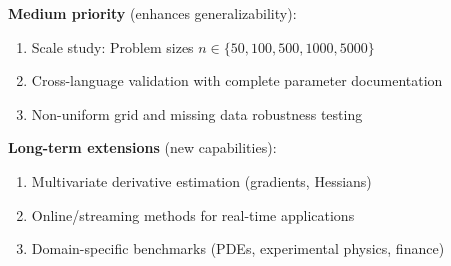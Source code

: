 \textbf{Medium priority} (enhances generalizability):
\begin{enumerate}
    \item Scale study: Problem sizes $n \in \{50, 100, 500, 1000, 5000\}$
    \item Cross-language validation with complete parameter documentation
    \item Non-uniform grid and missing data robustness testing
\end{enumerate}

\textbf{Long-term extensions} (new capabilities):
\begin{enumerate}
    \item Multivariate derivative estimation (gradients, Hessians)
    \item Online/streaming methods for real-time applications
    \item Domain-specific benchmarks (PDEs, experimental physics, finance)
\end{enumerate}

